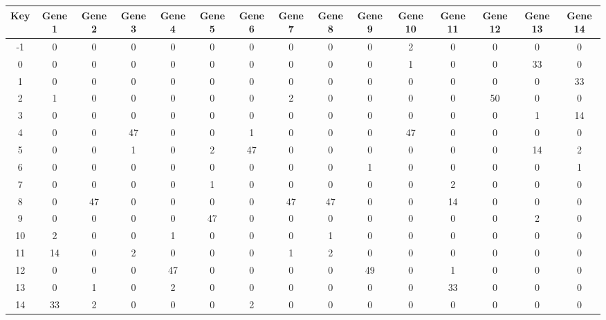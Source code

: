 \begin{tabular}{|c|c|c|c|c|c|c|c|c|c|c|c|c|c|c|}
\hline
Key & Gene 1 & Gene 2 & Gene 3 & Gene 4 & Gene 5 & Gene 6 & Gene 7 & Gene 8 & Gene 9 & Gene 10 & Gene 11 & Gene 12 & Gene 13 & Gene 14 \\
\hline
-1 & 0 & 0 & 0 & 0 & 0 & 0 & 0 & 0 & 0 & 2 & 0 & 0 & 0 & 0 \\
0 & 0 & 0 & 0 & 0 & 0 & 0 & 0 & 0 & 0 & 1 & 0 & 0 & 33 & 0 \\
1 & 0 & 0 & 0 & 0 & 0 & 0 & 0 & 0 & 0 & 0 & 0 & 0 & 0 & 33 \\
2 & 1 & 0 & 0 & 0 & 0 & 0 & 2 & 0 & 0 & 0 & 0 & 50 & 0 & 0 \\
3 & 0 & 0 & 0 & 0 & 0 & 0 & 0 & 0 & 0 & 0 & 0 & 0 & 1 & 14 \\
4 & 0 & 0 & 47 & 0 & 0 & 1 & 0 & 0 & 0 & 47 & 0 & 0 & 0 & 0 \\
5 & 0 & 0 & 1 & 0 & 2 & 47 & 0 & 0 & 0 & 0 & 0 & 0 & 14 & 2 \\
6 & 0 & 0 & 0 & 0 & 0 & 0 & 0 & 0 & 1 & 0 & 0 & 0 & 0 & 1 \\
7 & 0 & 0 & 0 & 0 & 1 & 0 & 0 & 0 & 0 & 0 & 2 & 0 & 0 & 0 \\
8 & 0 & 47 & 0 & 0 & 0 & 0 & 47 & 47 & 0 & 0 & 14 & 0 & 0 & 0 \\
9 & 0 & 0 & 0 & 0 & 47 & 0 & 0 & 0 & 0 & 0 & 0 & 0 & 2 & 0 \\
10 & 2 & 0 & 0 & 1 & 0 & 0 & 0 & 1 & 0 & 0 & 0 & 0 & 0 & 0 \\
11 & 14 & 0 & 2 & 0 & 0 & 0 & 1 & 2 & 0 & 0 & 0 & 0 & 0 & 0 \\
12 & 0 & 0 & 0 & 47 & 0 & 0 & 0 & 0 & 49 & 0 & 1 & 0 & 0 & 0 \\
13 & 0 & 1 & 0 & 2 & 0 & 0 & 0 & 0 & 0 & 0 & 33 & 0 & 0 & 0 \\
14 & 33 & 2 & 0 & 0 & 0 & 2 & 0 & 0 & 0 & 0 & 0 & 0 & 0 & 0 \\
\hline
\end{tabular}